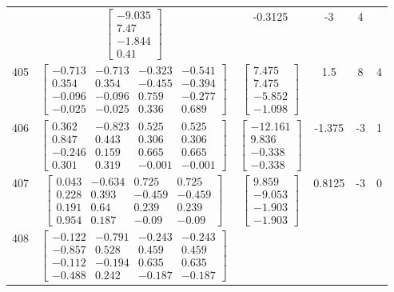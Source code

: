 \documentclass[a4paper,12pt]{article}
\begin{document}
\begin{tabular}{c c c c c c}
&
$\begin{bmatrix} -9.035 \\ 7.47 \\ -1.844 \\ 0.41 \end{bmatrix}$
&
-0.3125
&
-3
&
4
\\
405
&
$\begin{bmatrix} -0.713 & -0.713 & -0.323 & -0.541 \\ 0.354 & 0.354 & -0.455 & -0.394 \\ -0.096 & -0.096 & 0.759 & -0.277 \\ -0.025 & -0.025 & 0.336 & 0.689 \end{bmatrix}$
&
$\begin{bmatrix} 7.475 \\ 7.475 \\ -5.852 \\ -1.098 \end{bmatrix}$
&
1.5
&
8
&
4
\\
406
&
$\begin{bmatrix} 0.362 & -0.823 & 0.525 & 0.525 \\ 0.847 & 0.443 & 0.306 & 0.306 \\ -0.246 & 0.159 & 0.665 & 0.665 \\ 0.301 & 0.319 & -0.001 & -0.001 \end{bmatrix}$
&
$\begin{bmatrix} -12.161 \\ 9.836 \\ -0.338 \\ -0.338 \end{bmatrix}$
&
-1.375
&
-3
&
1
\\
407
&
$\begin{bmatrix} 0.043 & -0.634 & 0.725 & 0.725 \\ 0.228 & 0.393 & -0.459 & -0.459 \\ 0.191 & 0.64 & 0.239 & 0.239 \\ 0.954 & 0.187 & -0.09 & -0.09 \end{bmatrix}$
&
$\begin{bmatrix} 9.859 \\ -9.053 \\ -1.903 \\ -1.903 \end{bmatrix}$
&
0.8125
&
-3
&
0
\\
408
&
$\begin{bmatrix} -0.122 & -0.791 & -0.243 & -0.243 \\ -0.857 & 0.528 & 0.459 & 0.459 \\ -0.112 & -0.194 & 0.635 & 0.635 \\ -0.488 & 0.242 & -0.187 & -0.187 \end{bmatrix}$

\end{tabular}
\end{document}
